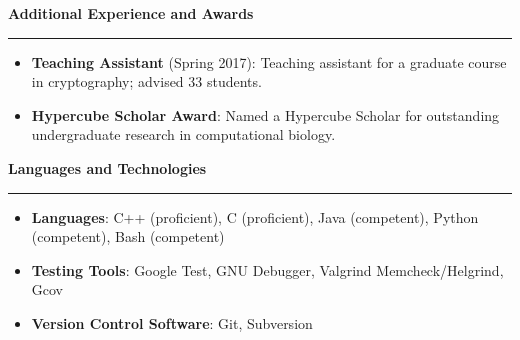 \documentclass[10pt,letterpaper]{article}
\begin{document}
\medskip

\begin{large}
        \textbf{Additional Experience and Awards}
\end{large}

\smallskip \hrule \smallskip

\begin{itemize}[topsep=0pt]
        \setlength\itemsep{-0.10em}
        \item \textbf{Teaching Assistant} (Spring 2017): Teaching assistant for a graduate course in cryptography; advised 33 students.
        \item \textbf{Hypercube Scholar Award}: Named a Hypercube Scholar for outstanding undergraduate research in computational biology.
\end{itemize}

\medskip

\begin{large}
        \textbf{Languages and Technologies}
\end{large}

\smallskip \hrule \smallskip

\begin{itemize}[topsep=0pt]
        \setlength\itemsep{-0.10em}
        \item \textbf{Languages}: C++ (proficient), C (proficient), Java (competent), Python (competent), Bash (competent)
        \item \textbf{Testing Tools}: Google Test, GNU Debugger, Valgrind Memcheck/Helgrind, Gcov
        \item \textbf{Version Control Software}: Git, Subversion
\end{itemize}
\end{document}
